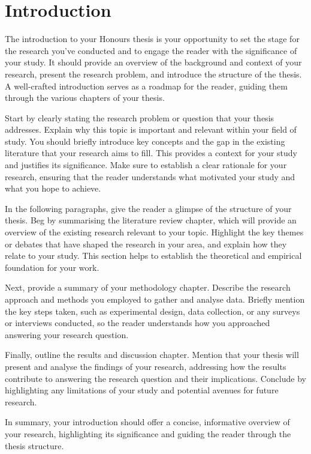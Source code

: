 \chapter{Introduction}

The introduction to your Honours thesis is your opportunity to set the stage for the research you’ve conducted and to engage the reader with the significance of your study. It should provide an overview of the background and context of your research, present the research problem, and introduce the structure of the thesis. A well-crafted introduction serves as a roadmap for the reader, guiding them through the various chapters of your thesis.

Start by clearly stating the research problem or question that your thesis addresses. Explain why this topic is important and relevant within your field of study. You should briefly introduce key concepts and the gap in the existing literature that your research aims to fill. This provides a context for your study and justifies its significance. Make sure to establish a clear rationale for your research, ensuring that the reader understands what motivated your study and what you hope to achieve.

In the following paragraphs, give the reader a glimpse of the structure of your thesis. Beg by summarising the literature review chapter, which will provide an overview of the existing research relevant to your topic. Highlight the key themes or debates that have shaped the research in your area, and explain how they relate to your study. This section helps to establish the theoretical and empirical foundation for your work.

Next, provide a summary of your methodology chapter. Describe the research approach and methods you employed to gather and analyse data. Briefly mention the key steps taken, such as experimental design, data collection, or any surveys or interviews conducted, so the reader understands how you approached answering your research question.

Finally, outline the results and discussion chapter. Mention that your thesis will present and analyse the findings of your research, addressing how the results contribute to answering the research question and their implications. Conclude by highlighting any limitations of your study and potential avenues for future research.

In summary, your introduction should offer a concise, informative overview of your research, highlighting its significance and guiding the reader through the thesis structure.